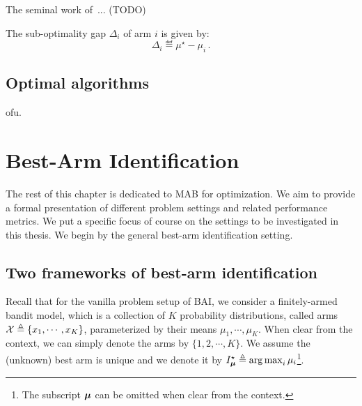 The seminal work of~\cite{robbins1952}... (TODO)

\begin{definition}\label{def:mab.gap}
\begin{leftbar}[defnbar]
The sub-optimality gap $\Delta_i$ of arm $i$ is given by:
\[
	\Delta_i \eqdef \mu^{\star} - \mu_i\,.
\]
\end{leftbar}
\end{definition}

\subsection{Optimal algorithms}\label{sec:mab.model.ucb}

\gls{ofu}.

\section{Best-Arm Identification}\label{sec:mab.bai}

The rest of this chapter is dedicated to MAB for optimization. We aim to provide a formal presentation of different problem settings and related performance metrics. We put a specific focus of course on the settings to be investigated in this thesis. We begin by the general best-arm identification setting.

\subsection{Two frameworks of best-arm identification}\label{sec:mab.bai.frameworks}

Recall that for the vanilla problem setup of BAI, we consider a finitely-armed bandit model, which is a collection of $K$ probability distributions, called arms $\mathcal{X}\triangleq\{x_1,\cdots,x_K\}$, parameterized by their means $\mu_1, \cdots, \mu_K$. When clear from the context, we can simply denote the arms by $\{1,2,\cdots,K\}$. We assume the (unknown) best arm is unique and we denote it by $I_{{\boldsymbol \mu}}^\star \triangleq \operatorname*{arg\,max}_i \mu_i$\footnote{The subscript ${\boldsymbol \mu}$ can be omitted when clear from the context.}. 

